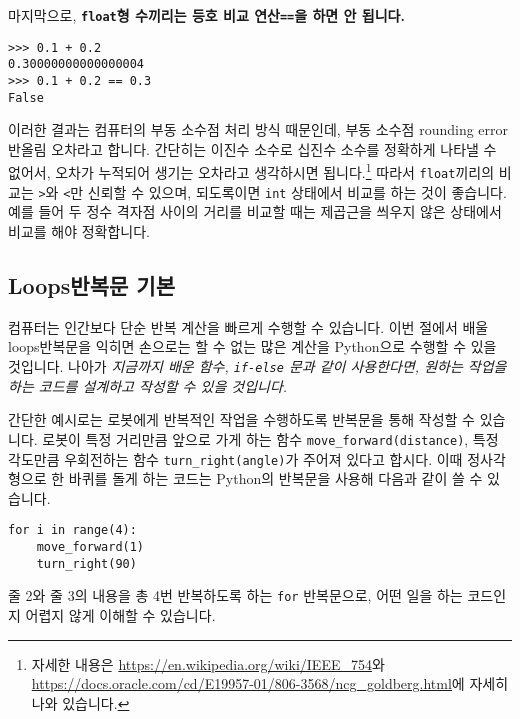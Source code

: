 \documentclass[../main.tex]{subfiles}
\begin{document}
마지막으로, \textbf{\texttt{float}형 수끼리는 등호 비교 연산\texttt{==}을 하면 안 됩니다.}
\begin{verbatim}
>>> 0.1 + 0.2
0.30000000000000004
>>> 0.1 + 0.2 == 0.3
False
\end{verbatim}
이러한 결과는 컴퓨터의 부동 소수점 처리 방식 때문인데, 부동 소수점 rounding error반올림 오차라고 합니다.
간단히는 이진수 소수로 십진수 소수를 정확하게 나타낼 수 없어서, 오차가 누적되어 생기는 오차라고 생각하시면 됩니다.\footnote{자세한 내용은 \url{https://en.wikipedia.org/wiki/IEEE_754}와 \url{https://docs.oracle.com/cd/E19957-01/806-3568/ncg_goldberg.html}에 자세히 나와 있습니다.}
따라서 \texttt{float}끼리의 비교는 \texttt{>}와 \texttt{<}만 신뢰할 수 있으며, 되도록이면 \texttt{int} 상태에서 비교를 하는 것이 좋습니다.
예를 들어 두 정수 격자점 사이의 거리를 비교할 때는 제곱근을 씌우지 않은 상태에서 비교를 해야 정확합니다.

\subsection{Loops반복문 기본}
컴퓨터는 인간보다 단순 반복 계산을 빠르게 수행할 수 있습니다.
이번 절에서 배울 loops반복문을 익히면 손으로는 할 수 없는 많은 계산을 Python으로 수행할 수 있을 것입니다.
나아가 \emph{지금까지 배운 함수, \texttt{if-else} 문과 같이 사용한다면, 원하는
작업을 하는 코드를 설계하고 작성할 수 있을 것입니다.}

간단한 예시로는 로봇에게 반복적인 작업을 수행하도록 반복문을 통해 작성할 수
있습니다.
로봇이 특정 거리만큼 앞으로 가게 하는 함수 \verb|move_forward(distance)|, 특정
각도만큼 우회전하는 함수 \verb|turn_right(angle)|가 주어져 있다고 합시다.
이때 정사각형으로 한 바퀴를 돌게 하는 코드는 Python의 반복문을 사용해 다음과
같이 쓸 수 있습니다.
\begin{verbatim}
for i in range(4):
    move_forward(1)
    turn_right(90)
\end{verbatim}
줄 2와 줄 3의 내용을 총 4번 반복하도록 하는 \verb|for| 반복문으로, 어떤 일을
하는 코드인지 어렵지 않게 이해할 수 있습니다.
\end{document}
